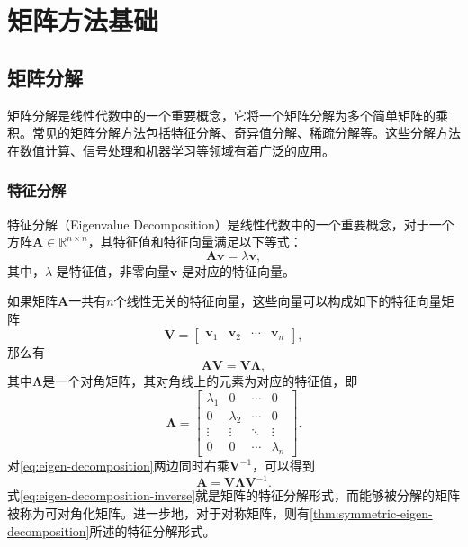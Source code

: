 \chapter{矩阵方法基础}

\section{矩阵分解}
矩阵分解是线性代数中的一个重要概念，它将一个矩阵分解为多个简单矩阵的乘积。常见的矩阵分解方法包括特征分解、奇异值分解、稀疏分解等。这些分解方法在数值计算、信号处理和机器学习等领域有着广泛的应用。

\subsection{特征分解}
特征分解（Eigenvalue Decomposition）是线性代数中的一个重要概念，对于一个方阵\( \mathbf{A} \in \mathbb{R}^{n \times n} \)，其特征值和特征向量满足以下等式：
\begin{equation}
    \mathbf{A} \bm{v} = \lambda \bm{v},
\end{equation}
其中，\( \lambda \) 是特征值，非零向量\( \bm{v} \) 是对应的特征向量。

如果矩阵\( \mathbf{A} \)一共有\( n \)个线性无关的特征向量，这些向量可以构成如下的特征向量矩阵
\[
    \mathbf{V} =
    \begin{bmatrix}
        \bm{v}_1 & \bm{v}_2 & \cdots & \bm{v}_n
    \end{bmatrix},
\]
那么有
\begin{equation}
    \mathbf{A} \mathbf{V} = \mathbf{V} \mathbf{\Lambda},
    \label{eq:eigen-decomposition}
\end{equation}
其中\( \mathbf{\Lambda} \)是一个对角矩阵，其对角线上的元素为对应的特征值，即
\[
    \mathbf{\Lambda} =
    \begin{bmatrix}
        \lambda_1 & 0         & \cdots & 0         \\
        0         & \lambda_2 & \cdots & 0         \\
        \vdots    & \vdots    & \ddots & \vdots    \\
        0         & 0         & \cdots & \lambda_n
    \end{bmatrix}.
\]
对\cref{eq:eigen-decomposition}两边同时右乘\( \mathbf{V}^{-1} \)，可以得到
\begin{equation}
    \mathbf{A} = \mathbf{V} \mathbf{\Lambda} \mathbf{V}^{-1}.
    \label{eq:eigen-decomposition-inverse}
\end{equation}
式\cref{eq:eigen-decomposition-inverse}就是矩阵的特征分解形式，而能够被分解的矩阵被称为可对角化矩阵。进一步地，对于对称矩阵，则有\cref{thm:symmetric-eigen-decomposition}所述的特征分解形式。

